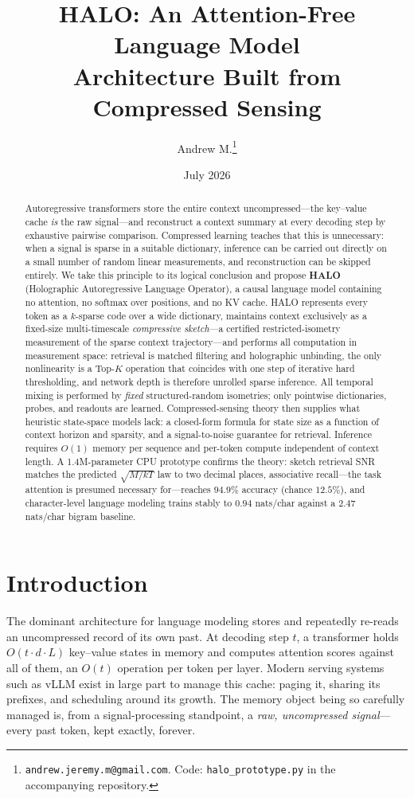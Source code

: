 \documentclass[11pt]{article}
\title{\textbf{HALO: An Attention-Free Language Model\\Architecture Built from Compressed Sensing}}
\author{Andrew M.\thanks{\texttt{andrew.jeremy.m@gmail.com}. Code: \texttt{halo\_prototype.py} in the accompanying repository.}}
\date{July 2026}
\begin{document}
\maketitle

\begin{abstract}
Autoregressive transformers store the entire context uncompressed---the key--value cache \emph{is} the raw signal---and reconstruct a context summary at every decoding step by exhaustive pairwise comparison. Compressed learning teaches that this is unnecessary: when a signal is sparse in a suitable dictionary, inference can be carried out directly on a small number of random linear measurements, and reconstruction can be skipped entirely. We take this principle to its logical conclusion and propose \textbf{HALO} (Holographic Autoregressive Language Operator), a causal language model containing no attention, no softmax over positions, and no KV cache. HALO represents every token as a $k$-sparse code over a wide dictionary, maintains context exclusively as a fixed-size multi-timescale \emph{compressive sketch}---a certified restricted-isometry measurement of the sparse context trajectory---and performs all computation in measurement space: retrieval is matched filtering and holographic unbinding, the only nonlinearity is a Top-$K$ operation that coincides with one step of iterative hard thresholding, and network depth is therefore unrolled sparse inference. All temporal mixing is performed by \emph{fixed} structured-random isometries; only pointwise dictionaries, probes, and readouts are learned. Compressed-sensing theory then supplies what heuristic state-space models lack: a closed-form formula for state size as a function of context horizon and sparsity, and a signal-to-noise guarantee for retrieval. Inference requires $O(1)$ memory per sequence and per-token compute independent of context length. A 1.4M-parameter CPU prototype confirms the theory: sketch retrieval SNR matches the predicted $\sqrt{M/kT}$ law to two decimal places, associative recall---the task attention is presumed necessary for---reaches $94.9\%$ accuracy (chance $12.5\%$), and character-level language modeling trains stably to $0.94$ nats/char against a $2.47$ nats/char bigram baseline.
\end{abstract}

\section{Introduction}

The dominant architecture for language modeling stores and repeatedly re-reads an uncompressed record of its own past. At decoding step $t$, a transformer \citep{vaswani2017attention} holds $O(t \cdot d \cdot L)$ key--value states in memory and computes attention scores against all of them, an $O(t)$ operation per token per layer. Modern serving systems such as vLLM \citep{kwon2023pagedattention} exist in large part to manage this cache: paging it, sharing its prefixes, and scheduling around its growth. The memory object being so carefully managed is, from a signal-processing standpoint, a \emph{raw, uncompressed signal}---every past token, kept exactly, forever.
\end{document}
